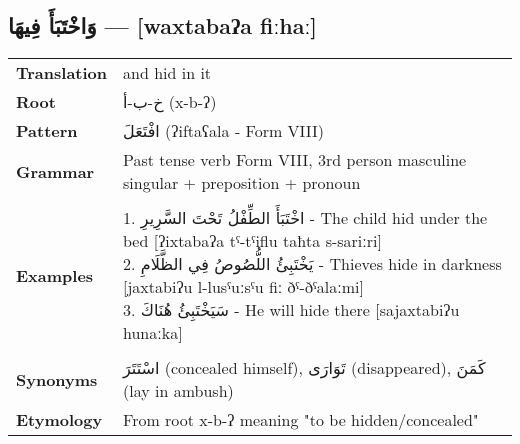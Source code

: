 \documentclass[letterpaper,12pt]{article}
\begin{document}
\subsection{\textarabic{وَاخْتَبَأَ فِيهَا} — [waxtabaʔa fiːhaː]}
\begin{tabular}{p{3cm}p{10cm}}
\toprule
\textbf{Translation} & and hid in it \\
\textbf{Root} & \textarabic{خ-ب-أ} (x-b-ʔ) \\
\textbf{Pattern} & \textarabic{افْتَعَلَ} (ʔiftaʕala - Form VIII) \\
\textbf{Grammar} & Past tense verb Form VIII, 3rd person masculine singular + preposition + pronoun \\
\midrule \\
\textbf{Examples} & \makecell[l]{\parbox{9.5cm}{
1. \textarabic{اخْتَبَأَ الطِّفْلُ تَحْتَ السَّرِيرِ} - The child hid under the bed [ʔixtabaʔa tˤ-tˤiflu taħta s-sariːri]\\
2. \textarabic{يَخْتَبِئُ اللُّصُوصُ فِي الظَّلَامِ} - Thieves hide in darkness [jaxtabiʔu l-lusˤuːsˤu fiː ðˤ-ðˤalaːmi]\\
3. \textarabic{سَيَخْتَبِئُ هُنَاكَ} - He will hide there [sajaxtabiʔu hunaːka]
}} \\
\midrule \\
\textbf{Synonyms} & \textarabic{اسْتَتَرَ} (concealed himself), \textarabic{تَوَارَى} (disappeared), \textarabic{كَمَنَ} (lay in ambush) \\
\textbf{Etymology} & From root x-b-ʔ meaning "to be hidden/concealed" \\
\bottomrule
\end{tabular}
\end{document}
